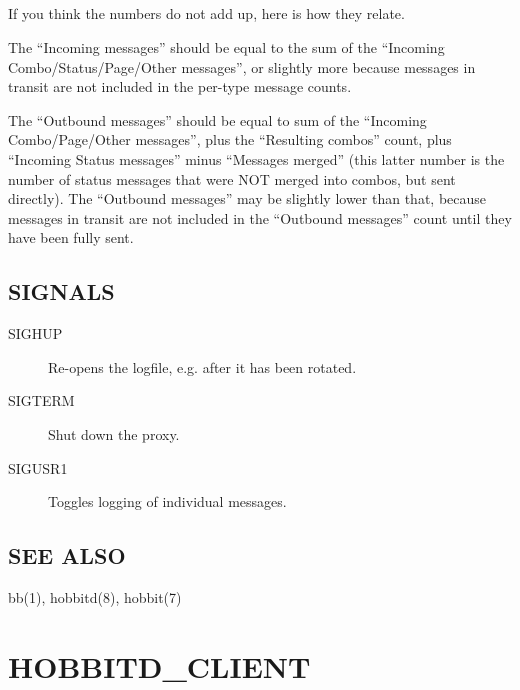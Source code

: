 \subsection{}
 If you think the numbers do not add up, here is how they relate. 

  The ``Incoming messages'' should be equal to the sum of the ``Incoming Combo/Status/Page/Other messages'', or slightly more because messages in transit are not included in the per-type message counts. 


  The ``Outbound messages'' should be equal to sum of the ``Incoming Combo/Page/Other messages'', plus the ``Resulting combos'' count, plus ``Incoming Status messages'' minus ``Messages merged'' (this latter number is the number of status messages that were NOT merged into combos, but sent directly). The ``Outbound messages'' may be slightly lower than that, because messages in transit are not included in the ``Outbound messages'' count until they have been fully sent. 


 
\subsection{SIGNALS}
\begin{description}
\item[SIGHUP] Re-opens the logfile, e.g. after it has been rotated. 

 

\item[SIGTERM] Shut down the proxy. 

 

\item[SIGUSR1] Toggles logging of individual messages. 

 


\end{description}
\subsection{SEE ALSO}
bb(1), hobbitd(8), hobbit(7) 



%
\newpage
\section{HOBBITD\_CLIENT}

